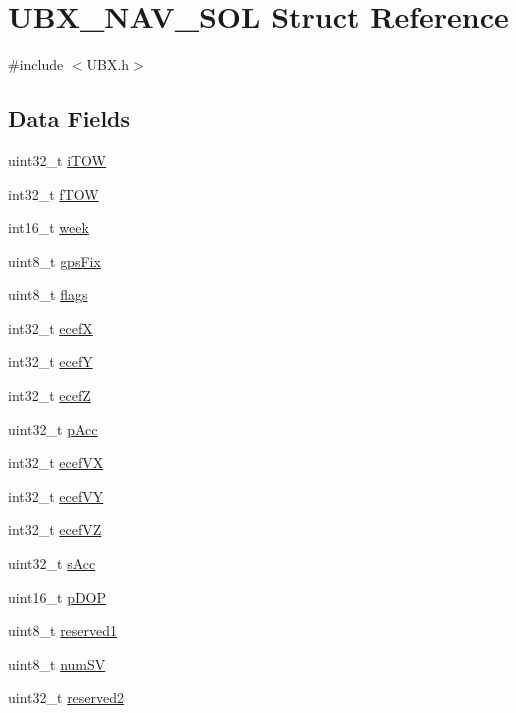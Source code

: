 \hypertarget{struct_u_b_x___n_a_v___s_o_l}{\section{\-U\-B\-X\-\_\-\-N\-A\-V\-\_\-\-S\-O\-L \-Struct \-Reference}
\label{struct_u_b_x___n_a_v___s_o_l}
}


{\ttfamily \#include $<$\-U\-B\-X.\-h$>$}

\subsection*{\-Data \-Fields}
\begin{DoxyCompactItemize}
\item 
uint32\-\_\-t \hyperlink{struct_u_b_x___n_a_v___s_o_l_a22a48bcb2972bbd63bf5b5c0a29b8713}{i\-T\-O\-W}
\item 
int32\-\_\-t \hyperlink{struct_u_b_x___n_a_v___s_o_l_a7e73f1e4919dbde57008c9f9fad153cf}{f\-T\-O\-W}
\item 
int16\-\_\-t \hyperlink{struct_u_b_x___n_a_v___s_o_l_aceeb9bd043b85b904f3a3bcfd1c2dc38}{week}
\item 
uint8\-\_\-t \hyperlink{struct_u_b_x___n_a_v___s_o_l_ae821898e9ca043790d8f58da75355f38}{gps\-Fix}
\item 
uint8\-\_\-t \hyperlink{struct_u_b_x___n_a_v___s_o_l_a25c7a16be058569db8ae95b89abf3b42}{flags}
\item 
int32\-\_\-t \hyperlink{struct_u_b_x___n_a_v___s_o_l_a9c671f98502c60d7997cccc3460e8879}{ecef\-X}
\item 
int32\-\_\-t \hyperlink{struct_u_b_x___n_a_v___s_o_l_aec3dced166e4dcaa0826b1e851532604}{ecef\-Y}
\item 
int32\-\_\-t \hyperlink{struct_u_b_x___n_a_v___s_o_l_af7e4df25c5986355c90a1a519b39b50d}{ecef\-Z}
\item 
uint32\-\_\-t \hyperlink{struct_u_b_x___n_a_v___s_o_l_af472e94738185b263cbfb4bffcca13ff}{p\-Acc}
\item 
int32\-\_\-t \hyperlink{struct_u_b_x___n_a_v___s_o_l_aafca9f9204a38e9bb1646848cafcfb38}{ecef\-V\-X}
\item 
int32\-\_\-t \hyperlink{struct_u_b_x___n_a_v___s_o_l_a579b66433d3effbb0ad527acae2f8379}{ecef\-V\-Y}
\item 
int32\-\_\-t \hyperlink{struct_u_b_x___n_a_v___s_o_l_a3bc6214c289d81550f8750382540c2ec}{ecef\-V\-Z}
\item 
uint32\-\_\-t \hyperlink{struct_u_b_x___n_a_v___s_o_l_a2f523fbe2cf2e2eeb885e5e54d633f17}{s\-Acc}
\item 
uint16\-\_\-t \hyperlink{struct_u_b_x___n_a_v___s_o_l_ac6ab9d0036a83196d847e1c4ed2389fb}{p\-D\-O\-P}
\item 
uint8\-\_\-t \hyperlink{struct_u_b_x___n_a_v___s_o_l_aa1df4884b23e42bf16bc237341d5001c}{reserved1}
\item 
uint8\-\_\-t \hyperlink{struct_u_b_x___n_a_v___s_o_l_ab171c210f9cc253577d01441b9e1c439}{num\-S\-V}
\item 
uint32\-\_\-t \hyperlink{struct_u_b_x___n_a_v___s_o_l_a2367f145076ebc428ec4ef901cdda367}{reserved2}
\end{DoxyCompactItemize}


